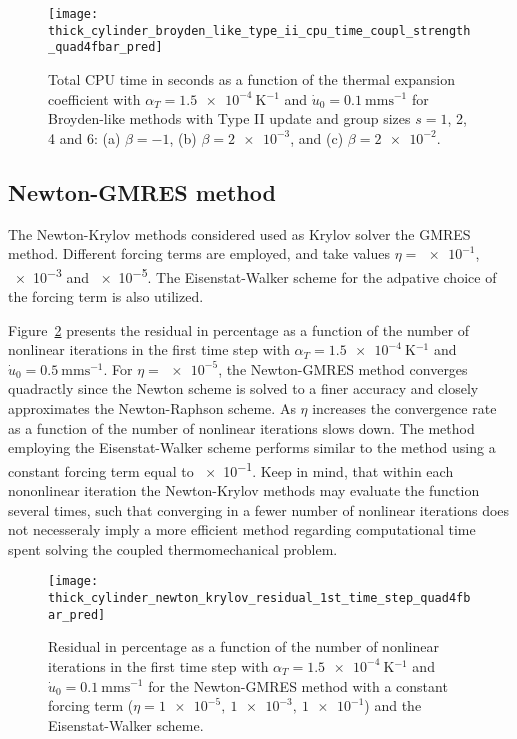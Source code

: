 \begin{figure}[htbp]
  \texttt{[image: thick\_cylinder\_broyden\_like\_type\_ii\_cpu\_time\_coupl\_strength\_quad4fbar\_pred]}
  \caption{Total CPU time in seconds as a function of the thermal expansion coefficient with \(\alpha_T=\SI{1.5e-4}{\kelvin^{-1}}\) and \(\dot u_0 =\SI{0.1}{\milli\meter\second^{-1}}\) for Broyden-like methods with Type II update and group sizes \(s=1\), 2, 4 and 6: (a) \(\beta=-1\), (b) \(\beta=\num{2e-3}\), and (c) \(\beta=\num{2e-2}\).}
\label{fig:thick_cylinder_broyden_like_type_ii_cpu_time_coupl_strength_quad4fbar_pred}
\end{figure}


\FloatBarrier

\subsection{Newton-GMRES method}

The Newton-Krylov methods considered used as Krylov solver the GMRES method.
Different forcing terms are employed, and take values \(\eta=\num{e-1}\), \num{e-3} and \num{e-5}.
The Eisenstat-Walker scheme for the adpative choice of the forcing term is also utilized.

Figure~\ref{fig:thick_cylinder_newton_krylov_residual_1st_time_step_quad4fbar_pred} presents the residual in percentage as a function of the number of nonlinear iterations in the first time step with \(\alpha_T=\SI{1.5e-4}{\kelvin^{-1}}\) and \(\dot u_0 =\SI{0.5}{\milli\meter\second^{-1}}\).
For \(\eta=\num{e-5}\), the Newton-GMRES method converges quadractly since the Newton scheme is solved to a finer accuracy and closely approximates the Newton-Raphson scheme.
As \(\eta\) increases the convergence rate as a function of the number of nonlinear iterations slows down.
The method employing the Eisenstat-Walker scheme performs similar to the method using a constant forcing term equal to \num{e-1}.
Keep in mind, that within each nononlinear iteration the Newton-Krylov methods may evaluate the function several times, such that converging in a fewer number of nonlinear iterations does not necesseraly imply a more efficient method regarding computational time spent solving the coupled thermomechanical problem.

\begin{figure}
  \texttt{[image: thick\_cylinder\_newton\_krylov\_residual\_1st\_time\_step\_quad4fbar\_pred]}
  \caption{Residual in percentage as a function of the number of nonlinear iterations in the first time step with \(\alpha_T=\SI{1.5e-4}{\kelvin^{-1}}\) and \(\dot u_0 =\SI{0.1}{\milli\meter\second^{-1}}\) for the Newton-GMRES method with a constant forcing term (\(\eta=\num{1e-5},\ \num{1e-3},\ \num{1e-1}\)) and the Eisenstat-Walker scheme. }
\label{fig:thick_cylinder_newton_krylov_residual_1st_time_step_quad4fbar_pred}
\end{figure}

